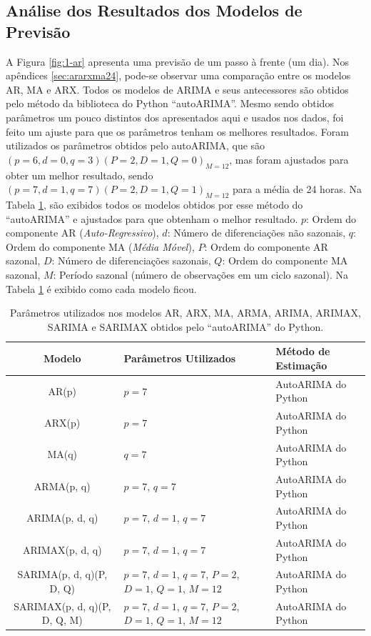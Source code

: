 \subsection{An\'alise dos Resultados dos Modelos de Previs\~ao}

A Figura \ref{fig:1-ar} apresenta uma previsão de um passo à frente (um dia). Nos apêndices \ref{sec:ararxma24}, pode-se observar uma comparação entre os modelos AR, MA e ARX.
Todos os modelos de ARIMA e seus antecessores são obtidos pelo método da biblioteca do Python ``autoARIMA''. Mesmo sendo obtidos parâmetros um pouco distintos dos apresentados aqui e usados nos dados, foi feito um ajuste para que os parâmetros tenham os melhores resultados. Foram utilizados os parâmetros obtidos pelo autoARIMA, que são $(p = 6, d = 0, q = 3) (P = 2, D = 1, Q = 0)_{M = 12}$, mas foram ajustados para obter um melhor resultado, sendo $(p = 7, d = 1, q = 7) (P = 2, D = 1, Q = 1)_{M = 12}$ para a média de 24 horas. Na Tabela \ref{tab:autoarima_params}, são exibidos todos os modelos obtidos por esse método do ``autoARIMA'' e ajustados para que obtenham o melhor resultado.
\(p\): Ordem do componente AR (\textit{Auto-Regressivo}),
\(d\): Número de diferenciações não sazonais,
\(q\): Ordem do componente MA (\textit{Média Móvel}),
\(P\): Ordem do componente AR sazonal,
\(D\): Número de diferenciações sazonais,
\(Q\): Ordem do componente MA sazonal,
\(M\): Período sazonal (número de observações em um ciclo sazonal).
Na Tabela \ref{tab:autoarima_params} é exibido como cada modelo ficou.


\begin{table}[htpb]
	\centering
	\caption{Parâmetros utilizados nos modelos AR, ARX, MA, ARMA, ARIMA, ARIMAX, SARIMA e SARIMAX obtidos pelo ``autoARIMA'' do Python.}
	\label{tab:autoarima_params}
	\small
	\begin{tabular}{cp{9cm}p{1.9cm}}
		\hline
		\textbf{Modelo} & \textbf{Parâmetros Utilizados} & \textbf{Método de Estimação} \\
		\hline
		AR(p) & \( p = 7 \) & AutoARIMA do Python \\
		ARX(p) & \( p = 7 \) & AutoARIMA do Python \\
		MA(q) & \( q = 7 \) & AutoARIMA do Python \\
		ARMA(p, q) & \( p = 7 \), \( q = 7 \) & AutoARIMA do Python \\
		ARIMA(p, d, q) & \( p = 7 \), \( d = 1 \), \( q = 7 \) & AutoARIMA do Python \\
		ARIMAX(p, d, q) & \( p = 7 \), \( d = 1 \), \( q = 7 \) & AutoARIMA do Python \\
		SARIMA(p, d, q)(P, D, Q) & \( p = 7 \), \( d = 1 \), \( q = 7 \), \( P = 2 \), \( D = 1 \), \( Q = 1 \), \( M = 12 \) & AutoARIMA do Python \\
		SARIMAX(p, d, q)(P, D, Q, M) & \( p = 7 \), \( d = 1 \), \( q = 7 \), \( P = 2 \), \( D = 1 \), \( Q = 1 \), \( M = 12 \) & AutoARIMA do Python \\
		\hline
	\end{tabular}
	
\end{table}


